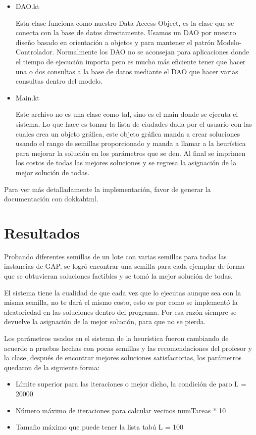 \documentclass{article}
\begin{document}
\begin{itemize}
{	}
	\item {DAO.kt
		
		Esta clase funciona como nuestro Data Access Object, es la clase que se conecta con la base de datos directamente. Usamos un DAO por nuestro diseño basado en orientación a objetos y para mantener el patrón Modelo-Controlador. Normalmente los DAO no se aconsejan para aplicaciones donde el tiempo de ejecución importa pero es mucho más eficiente tener que hacer una o dos consultas a la base de datos mediante el DAO que hacer varias consultas dentro del modelo.
	}
	\item {Main.kt
		
		Este archivo no es una clase como tal, sino es el main donde se ejecuta el sistema. Lo que hace es tomar la lista de ciudades dada por el usuario con las cuales crea un objeto gráfica, este objeto gráfica manda a crear soluciones usando el rango de semillas proporcionado y manda a llamar a la heurística para mejorar la solución en los parámetros que se den. Al final se imprimen los costos de todas las mejores soluciones y se regresa la asignación de la mejor solución de todas.
	}
\end{itemize}

Para ver más detalladamente la implementación, favor de generar la documentación con dokkahtml.


\section{Resultados}

Probando diferentes semillas de un lote con varias semillas para todas las instancias de GAP, se logró encontrar una semilla para cada ejemplar de forma que se obtuvieran soluciones factibles y se tomó la mejor solución de todas.

El sistema tiene la cualidad de que cada vez que lo ejecutas aunque sea con la misma semilla, no te dará el mismo costo, esto es por como se implementó la aleatoriedad en las soluciones dentro del programa. Por esa razón siempre se devuelve la asignación de la mejor solución, para que no se pierda. 

Los parámetros usados en el sistema de la heurística fueron cambiando de acuerdo a pruebas hechas con pocas semillas y las recomendaciones del profesor y la clase, después de encontrar mejores soluciones satisfactorias, los parámetros quedaron de la siguiente forma:
\begin{itemize}
\item Límite superior para las iteraciones o mejor dicho, la condición de paro
L = 20000
\item Número máximo de iteraciones para calcular vecinos 
numTareas * 10
\item Tamaño máximo que puede tener la lista tabú
L = 100
\end{itemize}
\end{document}
